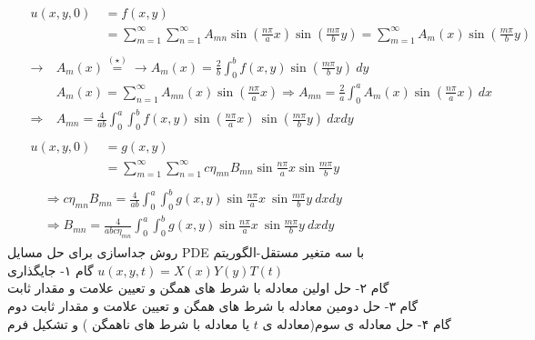 \begin{equation*}
	\begin{aligned}
	{} &\
	\begin{aligned}
		u(x,y,0) {} &\
		=f(x,y)
		\\ &\
		=\sum_{m=1}^{\infty}\sum_{n=1}^{\infty}A_{mn}  \sin \left(\frac{n \pi}{a}x\right) \sin\left( \frac{m \pi}{b}y\right)=\sum_{m=1}^{\infty}A_{m} (x)\sin \left(\frac{m \pi}{b}y\right)
	\end{aligned}
\\ &\
\begin{aligned}
	\rightarrow {} &\
	A_{m}(x)\overset{(\star)}{=}\rightarrow A_{m}(x)=\frac{2}{b}\int_{0}^{b}  f(x,y) \sin \left(\frac{m \pi }{b}y\right) \ dy
	\\ &\
	A_{m}(x)=\sum_{n=1}^{\infty} A_{mn}(x) \sin \left(\frac{n \pi }{a}x\right) \Rightarrow A_{mn}=\frac{2}{a}\int_{0}^{a} A_{m}(x) \sin \left(\frac{n \pi }{a}x\right) \ dx
	\\ \Rightarrow &\
	A_{mn}=\frac{4}{ab}\int_{0}^{a}\int_{0}^{b}  f(x,y)\sin \left(\frac{n \pi }{a}x\right)\ \sin \left(\frac{m \pi }{b}y\right) \ dx dy
\end{aligned}
\\ &\
\begin{aligned}
	{} 
	u(x,y,0) &\ =g(x,y) \\&\ =\sum_{m=1}^{\infty}\sum_{n=1}^{\infty}c \eta_{mn}B_{mn}  \sin \frac{n \pi}{a}x \sin \frac{m \pi}{b}y
\end{aligned}
\\ &\
\begin{aligned}
	{} &\
	\Rightarrow c \eta_{mn}B_{mn}=\frac{4}{ab}\int_{0}^{a}\int_{0}^{b}  g(x,y)\sin \frac{n \pi }{a}x \ \sin \frac{m \pi }{b}y \ dx dy
	\\ &\
	\Rightarrow B_{mn}=\frac{4}{abc \eta_{mn}}\int_{0}^{a}\int_{0}^{b}  g(x,y)\sin \frac{n \pi }{a}x \ \sin \frac{m \pi }{b}y \ dx dy
\end{aligned}
\end{aligned}
\end{equation*}
روش جداسازی برای حل مسایل PDE با سه متغیر مستقل-الگوریتم\\
گام ۱- جایگذاری 
$u(x,y,t)=X(x)Y(y)T(t)$\\
گام ۲- حل اولین معادله با شرط های همگن و تعیین علامت و مقدار ثابت\\
گام ۳- حل دومین معادله با شرط های همگن و تعیین علامت و مقدار ثابت دوم \\
گام ۴- حل معادله ی سوم(معادله ی
$t$
یا معادله با شرط های ناهمگن
)
و تشکیل فرم

